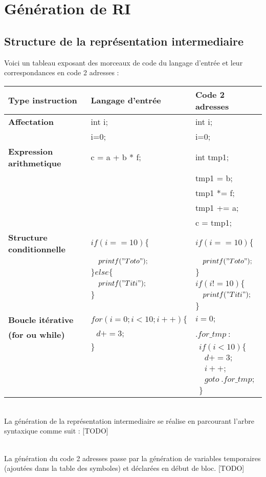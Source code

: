 \newpage
\section{Génération de RI}
\subsection{Structure de la représentation intermediaire}

Voici un tableau exposant des morceaux de code du langage d'entrée et leur correspondances en code 2 adresses : \\

\begin{tabular}{|l|l|l|}
  \hline
  \textbf{Type instruction} & \textbf{Langage d'entrée} & \textbf{Code 2 adresses} \\
  \hline
  \textbf{Affectation} & int i; & int i; \tabularnewline
    & i=0; & i=0; \tabularnewline
  \hline
  \textbf{Expression arithmetique} & c = a + b * f; & int tmp1; \tabularnewline
   & & tmp1 = b; \tabularnewline
   & & tmp1 *= f; \tabularnewline
   & & tmp1 += a; \tabularnewline
   & & c = tmp1; \tabularnewline
  \hline
  \textbf{Structure conditionnelle} & \raggedleft $if(i==10)\{$ & $if(i==10)\{$ \tabularnewline
  & $\ \ \ printf("Toto");$ & \raggedleft $\ \ \ printf("Toto");$ \tabularnewline
  & $\} else \{$ & \raggedleft $\}$ \tabularnewline
  & $\ \ \ printf("Titi");$ & \raggedleft $if(i!=10)\{$ \tabularnewline
  & $\} $ & \raggedleft $\ \ \ printf("Titi");$ \tabularnewline
  & & \raggedleft $\}$ \tabularnewline
  \hline
  \textbf{Boucle itérative} & \raggedleft $for(i=0; i<10; i++)\{$ & $i = 0;$ \tabularnewline
  \textbf{(for ou while)} & $\ \ \ d += 3;$ & \raggedleft $.for\_tmp\ :$ \tabularnewline
  & $\}$ & \raggedleft $\ \ if(i<10)\{$ \tabularnewline
  & & \raggedleft $\ \ \ \ \ d += 3;$ \tabularnewline
  & & \raggedleft $\ \ \ \ \ i++;$ \tabularnewline
  & & \raggedleft $\ \ \ \ \ goto\ .for\_tmp;$  \tabularnewline
  & & \raggedleft $\ \ \}$ \tabularnewline
  \hline
\end{tabular}

~~\\
La génération de la représentation intermediaire se réalise en parcourant l'arbre syntaxique comme suit :
[TODO]

~~\\
La génération du code 2 adresses passe par la génération de variables temporaires (ajoutées dans la table des symboles) et déclarées en début de bloc. 
[TODO]




